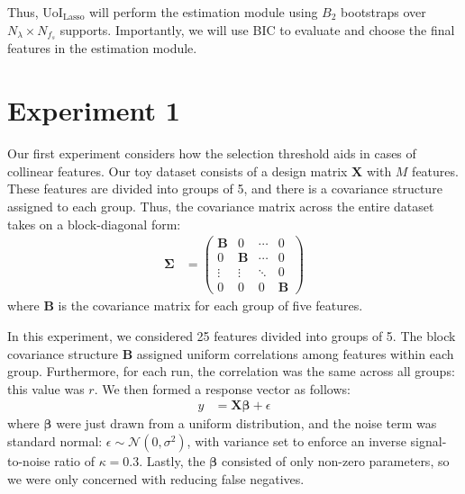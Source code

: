 \documentclass[11pt]{article}
\begin{document}
	Thus, UoI$_{\text{Lasso}}$ will perform the estimation module using $B_2$ bootstraps over $N_{\lambda}\times N_{f_s}$ supports. Importantly, we will use BIC to evaluate and choose the final features in the estimation module.
	
\section{Experiment 1}
	Our first experiment considers how the selection threshold aids in cases of collinear features. Our toy dataset consists of a design matrix $\mathbf{X}$ with $M$ features. These features are divided into groups of 5, and there is a covariance structure assigned to each group. Thus, the covariance matrix across the entire dataset takes on a block-diagonal form:
	\begin{align}
		\boldsymbol{\Sigma} &= \left(
			\begin{array}{cccc}
			\mathbf{B} &	0 & \cdots  &	0\\
				0			 & \mathbf{B} & \cdots & 0 \\
			\vdots		 & 	\vdots			& \ddots & 0 \\
			0 & 0 & 0  & \mathbf{B}
			\end{array}
		\right)
	\end{align}
	where $\mathbf{B}$ is the covariance matrix for each group of five features. 
	
	In this experiment, we considered 25 features divided into groups of 5. The block covariance structure $\mathbf{B}$ assigned uniform correlations among features within each group. Furthermore, for each run, the correlation was the same across all groups: this value was $r$. We then formed a response vector as follows:
	\begin{align}
		y &= \mathbf{X}\boldsymbol{\beta} + \epsilon
	\end{align}
	where $\boldsymbol{\beta}$ were just drawn from a uniform distribution, and the noise term was standard normal: $\epsilon \sim \mathcal{N}(0, \sigma^2)$, with variance set to enforce an inverse signal-to-noise ratio of $\kappa=0.3$. Lastly, the $\boldsymbol{\beta}$ consisted of only non-zero parameters, so we were only concerned with reducing false negatives.
	
\end{document}
